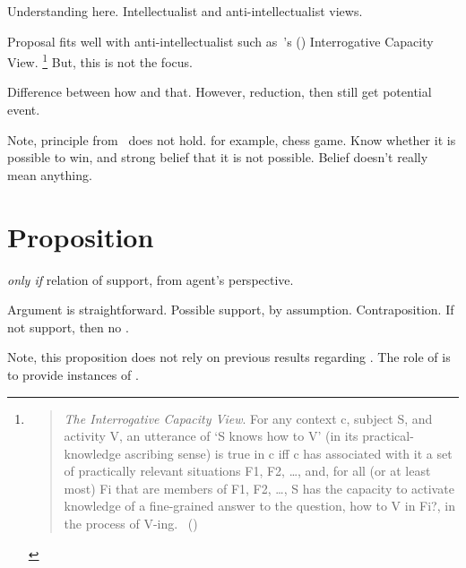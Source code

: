 \begin{note}
  Understanding here.
  Intellectualist and anti-intellectualist views.

  Proposal fits well with anti-intellectualist such as~\citeauthor{Habgood-Coote:2019we}'s (\citeyear{Habgood-Coote:2019we}) Interrogative Capacity View.%
  \footnote{
    \begin{quote}
      \emph{The Interrogative Capacity View}.
      For any context c, subject S, and activity V, an utterance of `S knows how to V' (in its practical-knowledge ascribing sense) is true in c iff c has associated with it a set of practically relevant situations {F1, F2, \dots}, and, for all (or at least most) Fi that are members of {F1, F2, \dots}, S has the capacity to activate knowledge of a ﬁne-grained answer to the question, how to V in Fi?, in the process of V-ing.%
      \mbox{ }\hfill\mbox{(\citeyear[92]{Habgood-Coote:2019we})}
    \end{quote}
  }
  But, this is not the focus.
\end{note}

\begin{note}
  Difference between how and that.
  However, reduction, then still get potential event.
\end{note}

\begin{note}
  Note, principle from~\cite{Barker:1975un} does not hold.
  for example, chess game.
  Know whether it is possible to win, and strong belief that it is not possible.
  Belief doesn't really mean anything.
\end{note}

\section{Proposition}
\label{sec:proposition}

\begin{note}
  \begin{proposition}
    \label{prop:fcs-only-if-support}
     \emph{only if} relation of support, from agent's perspective.
  \end{proposition}

  Argument is straightforward.
  Possible support, by assumption.
  Contraposition.
  If not support, then no \fc{}.

  Note, this proposition does not rely on previous results regarding \qzS{}.
  The role of \qzS{} is to provide instances of .
\end{note}

